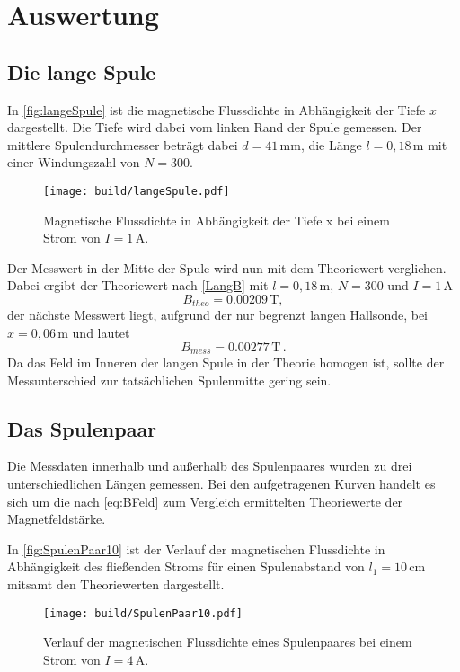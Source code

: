 \section{Auswertung}
\label{sec:Auswertung}

\subsection{Die lange Spule}
\label{sec:langeSpule}
In \autoref{fig:langeSpule} ist die magnetische Flussdichte in Abhängigkeit der Tiefe $x$ dargestellt. Die Tiefe
wird dabei vom linken Rand der Spule gemessen. Der mittlere Spulendurchmesser beträgt dabei $d=41 \, \unit{\milli\meter}$, 
die Länge $l=0,18 \, \unit{\meter}$ mit einer Windungszahl von $N=300$.
\begin{figure}[H]
    \centering
    \texttt{[image: build/langeSpule.pdf]}
    \caption{Magnetische Flussdichte in Abhängigkeit der Tiefe x bei einem Strom von $I= 1 \, \unit{\ampere}$.}
    \label{fig:langeSpule}
  \end{figure}

Der Messwert in der Mitte der Spule wird nun mit dem Theoriewert verglichen.
Dabei ergibt der Theoriewert nach \eqref{LangB} mit $l=0,18 \, \unit{\meter}$, $N=300$ und $I= 1\, \unit{\ampere}$
\begin{equation*}
  B_{theo}= 0.00209 \, \unit{\tesla},
\end{equation*}
der nächste Messwert liegt, aufgrund der nur begrenzt langen Hallsonde, bei $x=0,06\, \unit{\meter}$ und lautet
\begin{equation*}
  B_{mess} = 0.00277 \, \unit{\tesla}\,.
\end{equation*}
Da das Feld im Inneren der langen Spule in der Theorie homogen ist, sollte der Messunterschied zur tatsächlichen Spulenmitte
gering sein. 

\newpage

\subsection{Das Spulenpaar}
\label{sec:Spulenpaar}
Die Messdaten innerhalb und außerhalb des Spulenpaares wurden zu drei unterschiedlichen Längen gemessen. 
Bei den aufgetragenen Kurven handelt es sich um die nach \eqref{eq:BFeld} zum Vergleich ermittelten Theoriewerte
der Magnetfeldstärke.

In \autoref{fig:SpulenPaar10} ist der Verlauf der magnetischen Flussdichte in Abhängigkeit des fließenden Stroms
für einen Spulenabstand von $l_1= 10 \, \unit{\centi\meter}$ mitsamt den Theoriewerten dargestellt.
  \begin{figure}[H]
    \centering
    \texttt{[image: build/SpulenPaar10.pdf]}
    \caption{Verlauf der magnetischen Flussdichte eines Spulenpaares bei einem Strom von $I= 4 \, \unit{\ampere}$.}
    \label{fig:SpulenPaar10}
  \end{figure}

